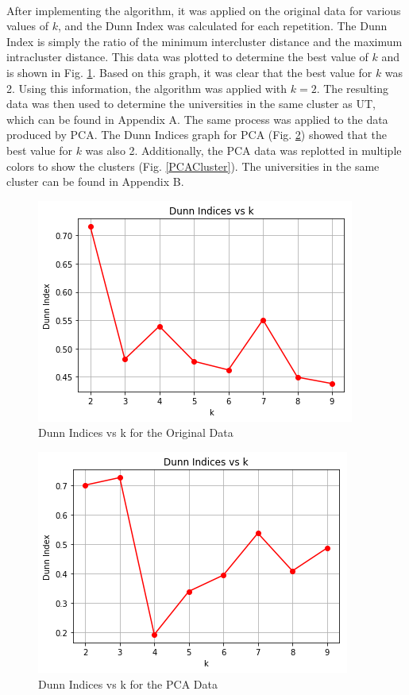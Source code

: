 \documentclass[12pt]{article}
\begin{document}
    \paragraph{}
    After implementing the algorithm, it was applied on the original data for various values of $k$, and the Dunn Index was calculated for each repetition. The Dunn Index is simply the ratio of the minimum intercluster distance and the maximum intracluster distance. This data was plotted to determine the best value of $k$ and is shown in Fig. \ref{Dunn}. Based on this graph, it was clear that the best value for $k$ was 2. Using this information, the algorithm was applied with $k = 2$. The resulting data was then used to determine the universities in the same cluster as UT, which can be found in Appendix A. The same process was applied to the data produced by PCA. The Dunn Indices graph for PCA (Fig. \ref{DunnPCA}) showed that the best value for $k$ was also 2. Additionally, the PCA data was replotted in multiple colors to show the clusters (Fig. \ref{PCACluster}). The universities in the same cluster can be found in Appendix B.
    \begin{figure}
    	\includegraphics[width=\linewidth]{Pictures/Dunn.png}
    	\caption{Dunn Indices vs k for the Original Data}
    	\label{Dunn}
    \end{figure}
    \begin{figure}
	    \includegraphics[width=\linewidth]{Pictures/DunnPCA.png}
	    \caption{Dunn Indices vs k for the PCA Data}
	    \label{DunnPCA}
    \end{figure}
\end{document}
